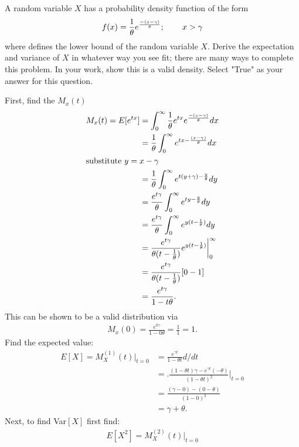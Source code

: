 \documentclass[answers]{exam}
\begin{document}
\begin{questions}
\question 
A random variable $X$ has a probability density function of the form
\[ f(x) = \frac{1}{\theta} e^{\frac{-(x-\gamma)}{\theta}};\hspace{5ex} x>\gamma\]
where defines the lower bound of the random variable $X$. Derive the expectation and variance of $X$ in whatever way you see fit; there are many ways to complete this problem. In your work, show this is a valid density. Select "True" as your answer for this question.
\begin{solution}
	First, find the $M_x(t)$ \\
	\begin{align*}
		M_x(t) = E[e^{tx}]
		&= \int_{0}^{\infty} \frac{1}{\theta} e^{tx}e^{\frac{-(x-\gamma)}{\theta}} dx \\
		&= \frac{1}{\theta}  \int_{0}^{\infty} e^{tx-\frac{(x-\gamma)}{\theta}} dx \\
		\intertext{substitute $y=x-\gamma$}
		&= \frac{1}{\theta}  \int_{0}^{\infty} e^{t(y+\gamma)-\frac{y}{\theta}} dy \\
		&= \frac{e^{t\gamma}}{\theta}  \int_{0}^{\infty} e^{ty-\frac{y}{\theta}} dy \\
		&= \frac{e^{t\gamma}}{\theta}  \int_{0}^{\infty} e^{y(t-\frac{1}{\theta})} dy \\
		&= \frac{e^{t\gamma}}{\theta(t-\frac{1}{\theta})}  \bigg. e^{y(t-\frac{1}{\theta})} \bigg|_{0}^{\infty} \\
		&= \frac{e^{t\gamma}}{\theta(t-\frac{1}{\theta})} [0-1] \\
		&= \frac{e^{t\gamma}}{1-t\theta}.
	\end{align*}
	This can be shown to be a valid distribution via 
	\begin{align*}
		M_x(0) = \frac{e^{0\gamma}}{1-0\theta} = \frac{1}{1} = 1.
	\end{align*}
	Find the expected value:
	\begin{align*}
		E[X] = M^(1)_X(t)|_{t=0} 
		&= \frac{e^{\gamma t}}{1-\theta t} d/dt\\
		&= \bigg. \frac{(1-\theta t)\gamma-e^{\gamma t}(-\theta)}{(1-\theta t)^2} \bigg|_{t=0} \\
		&= \frac{(\gamma-0)-(0-\theta)}{(1-0)^2} \\
		&= \gamma + \theta.
	\end{align*}
	Next, to find Var$[X]$ first find:
	\begin{align*}
		E[X^2] = M^(2)_X(t)|_{t=0} 

\end{align*}
\end{solution}
\end{questions}
\end{document}
